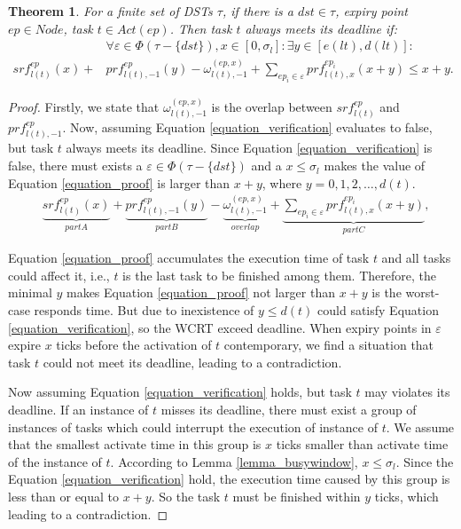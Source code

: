 \documentclass[conference]{IEEEtran}
\newtheorem{theorem}{Theorem}
\begin{document}
\begin{theorem}\label{theorem_testtask}
  For a finite set of DSTs $\tau$, if there is a $dst\in\tau$, expiry point $ep\in Node$, task $t\in Act(ep)$. Then task $t$ always meets its deadline if:
   \begin{equation}\begin{split}
      &\forall \varepsilon\in\Phi(\tau-\{dst\}),x\in[0,\sigma_l]:\exists y\in[e(lt),d(lt)]:\\
      srf^{ep}_{l(t)}(x)+&prf^{ep}_{l(t),-1}(y)-\omega_{l(t),-1}^{(ep,x)}
      +\sum\limits_{ep_i\in \varepsilon}prf^{ep_i}_{l(t),x}(x+y)\leq x+y.
    \end{split}\label{equation_verification}\end{equation}
\end{theorem}
\begin{proof}

  Firstly, we state that $\omega_{l(t),-1}^{(ep,x)}$ is the overlap between $srf^{ep}_{l(t)}$ and $prf^{ep}_{l(t),-1}$. Now, assuming Equation \ref{equation_verification} evaluates to false, but task $t$ always meets its deadline. Since Equation \ref{equation_verification} is false, there must exists a $\varepsilon\in\Phi(\tau-\{dst\})$ and a $x\leq \sigma_l$ makes the value of Equation \ref{equation_proof} is larger than $x+y$, where $y=0,1,2,\dots,d(t)$.
  \begin{equation}\begin{split}
      &\underbrace{srf^{ep}_{l(t)}(x)}_{part A}+\underbrace{prf^{ep}_{l(t),-1}(y)}_{part B}-\underbrace{\omega^{(ep,x)}_{l(t),-1}}_{overlap}+\underbrace{\sum\limits_{ep_i\in \varepsilon}prf^{ep_i}_{l(t),x}(x+y)}_{part C},
    \end{split}\label{equation_proof}\end{equation}
  
  Equation \ref{equation_proof} accumulates the execution time of task $t$ and all tasks could affect it, i.e., $t$ is the last task to be finished among them. Therefore, the minimal $y$ makes Equation \ref{equation_proof} not larger than $x+y$ is the worst-case responds time. But due to inexistence of $y\leq d(t)$ could satisfy Equation \ref{equation_verification}, so the WCRT exceed deadline. When expiry points in $\varepsilon$ expire $x$ ticks before the activation of $t$ contemporary, we find a situation that task $t$ could not meet its deadline, leading to a contradiction. 
  
  Now assuming Equation \ref{equation_verification} holds, but task $t$ may violates its deadline. If an instance of $t$ misses its deadline, there must exist a group of instances of tasks which could interrupt the execution of instance of $t$. We assume that the smallest activate time in this group is $x$ ticks smaller than activate time of the instance of $t$. According to Lemma \ref{lemma_busywindow}, $x\leq \sigma_l$. Since the Equation \ref{equation_verification} hold, the execution time caused by this group is less than or equal to $x+y$. So the task $t$ must be finished within $y$ ticks, which leading to a contradiction.
\end{proof}
\end{document}
